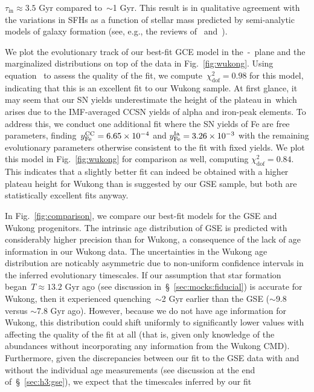 \documentclass[ms.tex]{subfiles}
\begin{document}
$\tau_\text{in} \approx 3.5$ Gyr compared to~$\sim$1 Gyr.
This result is in qualitative agreement with the variations in SFHs as a
function of stellar mass predicted by semi-analytic models of galaxy formation
(see, e.g., the reviews of~\citealt{Baugh2006} and~\citealt{Somerville2015a}).
\par
We plot the evolutionary track of our best-fit GCE model in the~\afe-\feh~plane
and the marginalized distributions on top of the data in Fig.~\ref{fig:wukong}.
Using equation~ to assess the quality of the fit,
we compute~$\chi_\text{dof}^2 = 0.98$ for this model, indicating that this is
an excellent fit to our Wukong sample.
At first glance, it may seem that our SN yields underestimate the height of the
plateau in~\afe which arises due to the IMF-averaged CCSN yields of alpha
and iron-peak elements.
To address this, we conduct one additional fit where the SN yields of Fe are
free parameters, finding~$y_\text{Fe}^\text{CC} = 6.65\times10^{-4}$ and
$y_\text{Fe}^\text{Ia} = 3.26\times10^{-3}$ with the remaining evolutionary parameters
otherwise consistent to the fit with fixed yields.
We plot this model in Fig.~\ref{fig:wukong} for comparison as well, computing
$\chi_\text{dof}^2 = 0.84$.
This indicates that a slightly better fit can indeed be obtained with a higher
plateau height for Wukong than is suggested by our GSE sample, but both are
statistically excellent fits anyway.
\par
In Fig.~\ref{fig:comparison}, we compare our best-fit models for the GSE and
Wukong progenitors.
The intrinsic age distribution of GSE is predicted with considerably higher
precision than for Wukong, a consequence of the lack of age information in our
Wukong data.
The uncertainties in the Wukong age distribution are noticably asymmetric due
to non-uniform confidence intervals in the inferred evolutionary timescales.
If our assumption that star formation began~$T \approx 13.2$ Gyr ago (see
discussion in~\S~\ref{sec:mocks:fiducial}) is accurate for Wukong, then it
experienced quenching~$\sim$2 Gyr earlier than the GSE ($\sim$9.8 versus
$\sim$7.8 Gyr ago).
However, because we do not have age information for Wukong, this distribution
could shift uniformly to significantly lower values with affecting the quality
of the fit at all (that is, given only knowledge of the abundances without
incorporating any information from the Wukong CMD).
Furthermore, given the discrepancies between our fit to the GSE data with and
without the individual age measurements (see discussion at the end
of~\S~\ref{sec:h3:gse}), we expect that the timescales inferred by our fit
\end{document}
